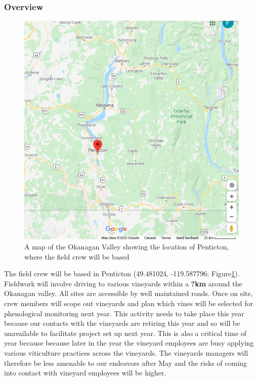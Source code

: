 \documentclass[11pt,letter]{article}
\begin{document}
\subsubsection{Overview}
\begin{figure}
  \includegraphics[width=\linewidth]{penticton.png}
  \caption{A map of the Okanagan Valley showing the location of Penticton, where the field crew will be based}
  \label{fig:OkanMap}
\end{figure}
The field crew will be based in Penticton (49.481024, -119.587796; Figure\ref{fig:OkanMap}). Fieldwork will involve driving to various vineyards within a \textbf{?km} around the Okanagan valley. All sites are accessible by well maintained roads. Once on site, crew members will scope out vineyards and plan which vines will be selected for phenological monitoring next year. This activity needs to take place this year because our contacts with the vineyards are retiring this year and so will be unavailable to facilitate project set up next year. This is also a critical time of year because because later in the year the vineyard employees are busy applying various viticulture practices across the vineyards. The vineyards managers will therefore be less amenable to our endeavors after May and the risks of coming into contact with vineyard employees will be higher.   
\end{document}
